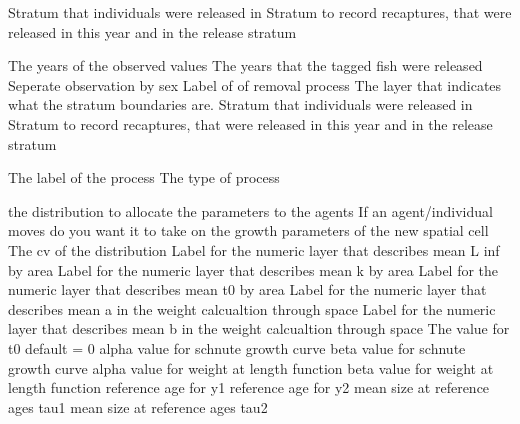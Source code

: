  {Stratum that individuals were released in}
 {Stratum to record recaptures, that were released in this year and in the release stratum}
\par\textbf{}\par
{} {The years of the observed values}
 {The years that the tagged fish were released}
 {Seperate observation by sex}
 {Label of of removal process}
 {The layer that indicates what the stratum boundaries are.}
 {Stratum that individuals were released in}
 {Stratum to record recaptures, that were released in this year and in the release stratum}
\par\par
{} {The label of the process}
 {The type of process}
\par\textbf{}\par
\par\textbf{}\par
{} {the distribution to allocate the parameters to the agents}
 {If an agent/individual moves do you want it to take on the growth parameters of the new spatial cell}
 {The cv of the distribution}
 {Label for the numeric layer that describes mean L inf by area}
 {Label for the numeric layer that describes mean k by area}
 {Label for the numeric layer that describes mean t0 by area}
 {Label for the numeric layer that describes mean a in the weight calcualtion through space}
 {Label for the numeric layer that describes mean b in the weight calcualtion through space}
 {The value for t0 default = 0}
 {alpha value for schnute growth curve}
 {beta value for schnute growth curve}
 {alpha value for weight at length function}
 {beta value for weight at length function}
 {reference age for y1}
 {reference age for y2}
 {mean size at reference ages tau1}
 {mean size at reference ages tau2}
 {}
 {}
